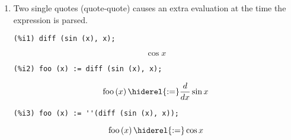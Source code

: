 \documentclass[12pt,leqno]{article}
\begin{document}
\begin{enumerate}
\item Two single quotes (quote-quote) causes an extra evaluation at the time the expression is parsed.
\begin{verbatim}
(%i1) diff (sin (x), x);
\end{verbatim}
\begin{dmath}[number={\(\mathop{\mathrm{\%o}_{1}}\)}]
\cos x
\end{dmath}
\begin{verbatim}
(%i2) foo (x) := diff (sin (x), x);
\end{verbatim}
\begin{dmath}[number={\(\mathop{\mathrm{\%o}_{2}}\)}]
\mathop{\mathrm{foo}}\left(x\right) \hiderel{:=} \frac{d}{d x}\sin x
\end{dmath}
\begin{verbatim}
(%i3) foo (x) := ''(diff (sin (x), x));
\end{verbatim}
\begin{dmath}[number={\(\mathop{\mathrm{\%o}_{3}}\)}]
\mathop{\mathrm{foo}}\left(x\right) \hiderel{:=} \cos x
\end{dmath}



\end{enumerate}
\end{document}
